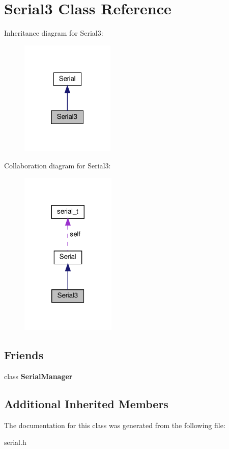 \hypertarget{classSerial3}{}\section{Serial3 Class Reference}
\label{classSerial3}


Inheritance diagram for Serial3\+:\nopagebreak
\begin{figure}[H]
\begin{center}
\leavevmode
\includegraphics[width=127pt]{classSerial3__inherit__graph}
\end{center}
\end{figure}


Collaboration diagram for Serial3\+:\nopagebreak
\begin{figure}[H]
\begin{center}
\leavevmode
\includegraphics[width=128pt]{classSerial3__coll__graph}
\end{center}
\end{figure}
\subsection*{Friends}
\begin{DoxyCompactItemize}
\item 
\mbox{\label{classSerial3_ae711712f6bc003a5d1156a409a19941b}} 
class {\bfseries Serial\+Manager}
\end{DoxyCompactItemize}
\subsection*{Additional Inherited Members}


The documentation for this class was generated from the following file\+:\begin{DoxyCompactItemize}
\item 
serial.\+h\end{DoxyCompactItemize}
